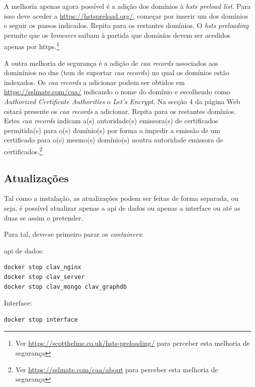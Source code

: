 A melhoria apenas agora possível é a adição dos domínios à \textit{\acrshort{hsts} preload list}. Para isso deve aceder a \url{https://hstspreload.org/}, começar por inserir um dos domínios e seguir os passos indicados. Repita para os restantes domínios. O \textit{\acrshort{hsts} preloading} permite que os \textit{browsers} saibam à partida que dominíos devem ser acedidos apenas por \acrshort{https}.\footnote{Ver \url{https://scotthelme.co.uk/hsts-preloading/} para perceber esta melhoria de segurança} 

A outra melhoria de segurança é a adição de \textit{\acrshort{caa} records} associados aos dominínios no \acrshort{dns} (tem de suportar \textit{\acrshort{caa} records}) no qual os domínios estão indexados. Os \textit{\acrshort{caa} records} a adicionar podem ser obtidos em \url{https://sslmate.com/caa/} indicando o nome do domínio e escolhendo como \textit{Authorized Certificate Authorities} o \textit{Let's Encrypt}. Na secção 4 da página Web estará presente os \textit{\acrshort{caa} records} a adicionar. Repita para os restantes domínios. Estes \textit{\acrshort{caa} records} indicam a(s) autoridade(s) emissora(s) de certificados permitida(s) para o(s) domínio(s) por forma a impedir a emissão de um certificado para o(s) mesmo(s) domínio(s) noutra autoridade emissora de certificados.\footnote{Ver \url{https://sslmate.com/caa/about} para perceber esta melhoria de segurança} 

\subsection{Atualizações}\label{sec:inst-update}

Tal como a instalação, as atualizações podem ser feitas de forma separada, ou seja, é possível atualizar apenas a \acrshort{api} de dados ou apenas a interface ou até as duas se assim o pretender.

Para tal, deve-se primeiro parar os \textit{containers}:

\footnotesize
\begin{center}
\begin{minipage}[t]{0.4\textwidth}
\acrshort{api} de dados:
\begin{verbatim}
docker stop clav_nginx
docker stop clav_server
docker stop clav_mongo clav_graphdb
\end{verbatim}
\end{minipage}%
\begin{minipage}[t]{0.4\textwidth}
Interface:
\begin{verbatim}
docker stop interface
\end{verbatim}
\end{minipage}
\end{center}
\normalsize

